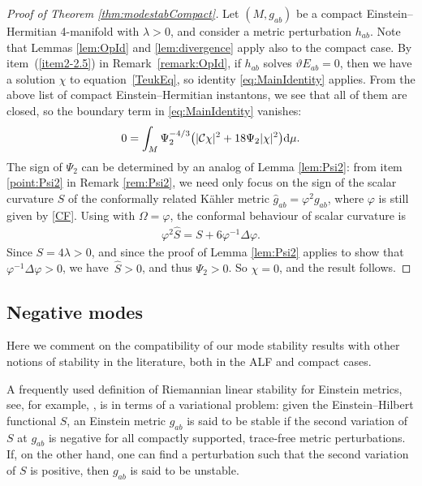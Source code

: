 \documentclass[10pt,a4paper]{amsart}
\numberwithin{equation}{section}
\begin{document}
\begin{proof}[Proof of Theorem \ref{thm:modestabCompact}]
Let $(M,g_{ab})$ be a compact Einstein--Hermitian 4-manifold with $\lambda>0$, and consider a metric perturbation $h_{ab}$. Note that Lemmas \ref{lem:OpId} and \ref{lem:divergence} apply also to the compact case. By item~(\ref{item2-2.5}) in Remark~\ref{remark:OpId}, if $h_{ab}$ solves $\vartheta E_{ab}=0$, then we have a solution $\chi$ to equation~\eqref{TeukEq}, so identity \eqref{eq:MainIdentity} applies. From the above list of compact Einstein--Hermitian instantons, we see that all of them are closed, so the boundary term in \eqref{eq:MainIdentity} vanishes:
\begin{align*}%
0 = \int_{M}\Psi_{2}^{-4/3}\bigl(|\mathcal{C}\chi|^{2} + 18\Psi_{2}|\chi|^2\bigr){\rm d}\mu.
\end{align*}
The sign of $\Psi_2$ can be determined by an analog of Lemma \ref{lem:Psi2}: from item \eqref{point:Psi2} in Remark \ref{rem:Psi2}, we need only focus on the sign of the scalar curvature $\hat{S}$ of the conformally related K\"ahler metric $\hat{g}_{ab}=\varphi^{2}g_{ab}$, where $\varphi$ is still given by \eqref{CF}. Using \cite[equation~(D.9)]{MR757180} with $\Omega=\varphi$, the conformal behaviour of scalar curvature is
\begin{align*}
 \varphi^2\hat{S} = S + 6\varphi^{-1}\Delta\varphi.
\end{align*}
Since $S=4\lambda>0$, and since the proof of Lemma \ref{lem:Psi2} applies to show that $\varphi^{-1}\Delta\varphi>0$, we have~${\hat{S}>0}$, and thus $\Psi_2>0$. So $\chi=0$, and the result follows.
\end{proof}


\subsection{Negative modes} %
Here we comment on the compatibility of our mode stability results with other notions of stability in the literature, both in the ALF and compact cases.

A frequently used definition of Riemannian linear stability for Einstein metrics, see, for example, \cite[Definition~4.63]{MR2371700}, is in terms of a variational problem: given the Einstein--Hilbert functional $S$, an Einstein metric $g_{ab}$ is said to be stable if the second variation of $S$ at $g_{ab}$ is negative for all compactly supported, trace-free metric perturbations. If, on the other hand, one can find a perturbation such that the second variation of $S$ is positive, then $g_{ab}$ is said to be unstable.
\end{document}

